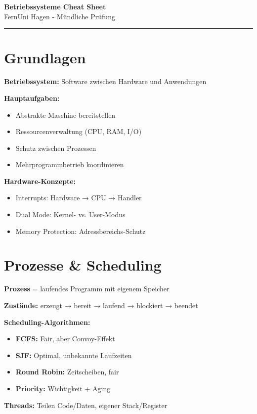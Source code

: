 \documentclass[10pt,a4paper]{article}
\begin{document}
\begin{center}
\textbf{\Large Betriebssysteme Cheat Sheet}\\
\small FernUni Hagen - Mündliche Prüfung
\end{center}
\hrule
\vspace{3mm}

\begin{multicols}{2}
\small

\section{Grundlagen}
\textbf{Betriebssystem:} Software zwischen Hardware und Anwendungen

\textbf{Hauptaufgaben:}
\begin{itemize}
\item Abstrakte Maschine bereitstellen
\item Ressourcenverwaltung (CPU, RAM, I/O)
\item Schutz zwischen Prozessen
\item Mehrprogrammbetrieb koordinieren
\end{itemize}

\textbf{Hardware-Konzepte:}
\begin{itemize}
\item Interrupts: Hardware → CPU → Handler
\item Dual Mode: Kernel- vs. User-Modus
\item Memory Protection: Adressbereichs-Schutz
\end{itemize}

\section{Prozesse \& Scheduling}
\textbf{Prozess} = laufendes Programm mit eigenem Speicher

\textbf{Zustände:} erzeugt → bereit → laufend → blockiert → beendet

\textbf{Scheduling-Algorithmen:}
\begin{itemize}
\item \textbf{FCFS:} Fair, aber Convoy-Effekt
\item \textbf{SJF:} Optimal, unbekannte Laufzeiten
\item \textbf{Round Robin:} Zeitscheiben, fair
\item \textbf{Priority:} Wichtigkeit + Aging
\end{itemize}

\textbf{Threads:} Teilen Code/Daten, eigener Stack/Register


\end{multicols}
\end{document}
